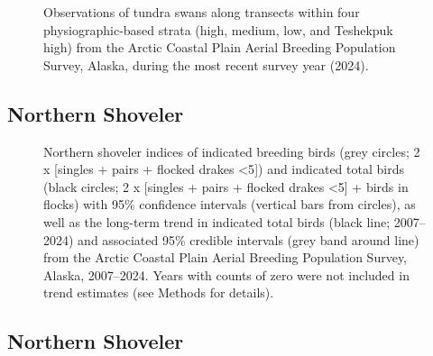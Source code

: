 \documentclass[
]{article}
\begin{document}
\begin{figure}


\caption{\label{fig-SWANmap}Observations of tundra swans along transects
within four physiographic-based strata (high, medium, low, and Teshekpuk
high) from the Arctic Coastal Plain Aerial Breeding Population Survey,
Alaska, during the most recent survey year (2024).}

\end{figure}%

\newpage{}

\subsection*{Northern Shoveler}\label{northern-shoveler}

\begin{figure}


\caption{\label{fig-NSHO}Northern shoveler indices of indicated breeding
birds (grey circles; 2 x {[}singles + pairs + flocked drakes
\textless5{]}) and indicated total birds (black circles; 2 x {[}singles
+ pairs + flocked drakes \textless5{]} + birds in flocks) with 95\%
confidence intervals (vertical bars from circles), as well as the
long-term trend in indicated total birds (black line; 2007--2024) and
associated 95\% credible intervals (grey band around line) from the
Arctic Coastal Plain Aerial Breeding Population Survey, Alaska,
2007--2024. Years with counts of zero were not included in trend
estimates (see Methods for details).}

\end{figure}%

\newpage{}

\subsection*{Northern Shoveler}\label{northern-shoveler-1}

\begingroup\fontsize{10}{12}\selectfont
\end{document}

